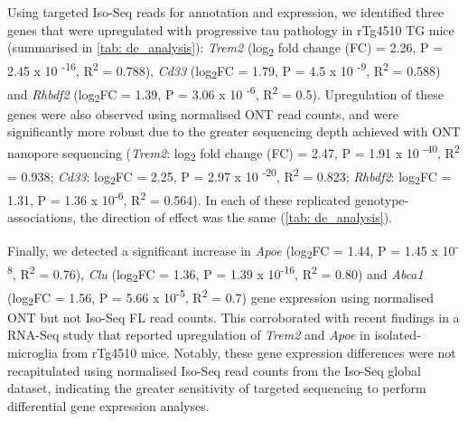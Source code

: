 Using targeted Iso-Seq reads for annotation and expression, we identified three genes that were upregulated with progressive tau pathology in rTg4510 TG mice (summarised in \cref{tab: de_analysis}): \textit{Trem2} (log\textsubscript{2} fold change (FC) = 2.26, P = 2.45 x 10 \textsuperscript{-16}, R\textsuperscript{2} = 0.788), \textit{Cd33} (log\textsubscript{2}FC = 1.79, P = 4.5 x 10 \textsuperscript{-9}, R\textsuperscript{2} = 0.588) and \textit{Rhbdf2} (log\textsubscript{2}FC = 1.39, P = 3.06 x 10 \textsuperscript{-6}, R\textsuperscript{2} = 0.5). Upregulation of these genes were also observed using normalised ONT read counts, and were significantly more robust due to the greater sequencing depth achieved with ONT nanopore sequencing (\textit{Trem2}: log\textsubscript{2} fold change (FC) = 2.47, P = 1.91 x 10 \textsuperscript{-40}, R\textsuperscript{2} = 0.938; \textit{Cd33}: log\textsubscript{2}FC = 2.25, P = 2.97 x 10 \textsuperscript{-20}, R\textsuperscript{2} = 0.823; \textit{Rhbdf2}: log\textsubscript{2}FC = 1.31, P = 1.36 x 10\textsuperscript{-6}, R\textsuperscript{2} = 0.564). In each of these replicated genotype-associations, the direction of effect was the same (\cref{tab: de_analysis}). 

Finally, we detected a significant increase in \textit{Apoe} (log\textsubscript{2}FC = 1.44, P = 1.45 x 10\textsuperscript{-8},  R\textsuperscript{2} = 0.76), \textit{Clu} (log\textsubscript{2}FC = 1.36, P = 1.39 x 10\textsuperscript{-16}, R\textsuperscript{2} = 0.80) and \textit{Abca1} (log\textsubscript{2}FC = 1.56, P = 5.66 x 10\textsuperscript{-5}, R\textsuperscript{2} = 0.7) gene expression using normalised ONT but not Iso-Seq FL read counts. This corroborated with recent findings in a RNA-Seq study that reported upregulation of \textit{Trem2} and \textit{Apoe} in isolated-microglia from rTg4510 mice\cite{Sobue2021}. Notably, these gene expression differences were not recapitulated using normalised Iso-Seq read counts from the Iso-Seq global dataset, indicating the greater sensitivity of targeted sequencing to perform differential gene expression analyses. 

